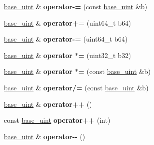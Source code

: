 \begin{DoxyCompactItemize}
\item 
\mbox{\label{classbase__uint_a89d8332840076ec102839b8a10dda9b4}} 
\mbox{\hyperlink{classbase__uint}{base\+\_\+uint}} \& {\bfseries operator-\/=} (const \mbox{\hyperlink{classbase__uint}{base\+\_\+uint}} \&b)
\item 
\mbox{\label{classbase__uint_a14f2b12970b3198d65abafb2615207ca}} 
\mbox{\hyperlink{classbase__uint}{base\+\_\+uint}} \& {\bfseries operator+=} (uint64\+\_\+t b64)
\item 
\mbox{\label{classbase__uint_ab64f7a7a87b9af5ea345e4678b4cc1e9}} 
\mbox{\hyperlink{classbase__uint}{base\+\_\+uint}} \& {\bfseries operator-\/=} (uint64\+\_\+t b64)
\item 
\mbox{\label{classbase__uint_a5aec6531cb4c7abef37f04eb2f55377e}} 
\mbox{\hyperlink{classbase__uint}{base\+\_\+uint}} \& {\bfseries operator $\ast$=} (uint32\+\_\+t b32)
\item 
\mbox{\label{classbase__uint_a9c1af3f3e83323b4e84308f2c94ecea5}} 
\mbox{\hyperlink{classbase__uint}{base\+\_\+uint}} \& {\bfseries operator $\ast$=} (const \mbox{\hyperlink{classbase__uint}{base\+\_\+uint}} \&b)
\item 
\mbox{\label{classbase__uint_ad6fa7e22ab995247c0bf298069732e1d}} 
\mbox{\hyperlink{classbase__uint}{base\+\_\+uint}} \& {\bfseries operator/=} (const \mbox{\hyperlink{classbase__uint}{base\+\_\+uint}} \&b)
\item 
\mbox{\label{classbase__uint_a56b54869886808961092d3f764fadd9f}} 
\mbox{\hyperlink{classbase__uint}{base\+\_\+uint}} \& {\bfseries operator++} ()
\item 
\mbox{\label{classbase__uint_a2d5a123c856b2b31fae5f65891832486}} 
const \mbox{\hyperlink{classbase__uint}{base\+\_\+uint}} {\bfseries operator++} (int)
\item 
\mbox{\label{classbase__uint_a2cc581d32afac619acd12601ddea4180}} 
\mbox{\hyperlink{classbase__uint}{base\+\_\+uint}} \& {\bfseries operator-\/-\/} ()
\item 

\end{DoxyCompactItemize}
